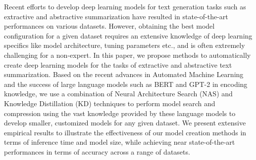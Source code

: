 Recent efforts to develop deep learning models for text generation tasks such as extractive and abstractive summarization have resulted in state-of-the-art performances on various datasets. However, obtaining the best model configuration for a given dataset requires an extensive knowledge of deep learning specifics like model architecture, tuning parameters etc., and is often extremely challenging for a non-expert. In this paper, we propose methods to automatically create deep learning models for the tasks of extractive and abstractive text summarization. Based on the recent advances in Automated Machine Learning and the success of large language models such as BERT and GPT-2 in encoding knowledge, we use a combination of Neural Architecture Search (NAS) and Knowledge Distillation (KD) techniques to perform model search and compression using the vast knowledge provided by these language models to develop smaller, customized models for any given dataset. We present extensive empirical results to illustrate the effectiveness of our model creation methods in terms of inference time and model size, while achieving near state-of-the-art performances in terms of accuracy across a range of datasets.
